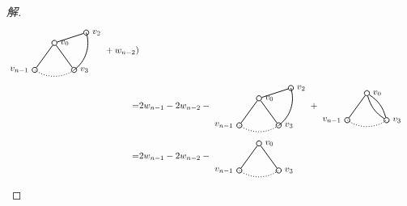 \documentclass{article}
\begin{document}
\begin{CJK}{UTF8}{gbsn}
\begin{proof}[解]
\begin{align*}
\begin{tikzpicture}[auto,baseline={(current bounding box.center)},
    specification/.style ={circle, draw, thick, inner sep = 0pt, minimum size=2mm}]
    \node[specification] (A)  [label=0:$v_2$] at (18:1.3cm)  {};
   \node[specification] (D) [label=180:$v_{n-1}$] at (234:1.3cm)  {};
   \node[specification] (E)  [label=0:$v_3$] at (306:1.3cm)  {};
   \node[specification] (o)  [label=0:$v_0$] at (0,0)  {};
   \draw[thick] (A) to   (o);
   \draw[thick] (D) to  (o);
   \draw[thick] (E) to  (o);
   \draw[thick,dotted] (234:1.3cm) arc (234:306:1.3cm);
   \draw[thick] (306:1.3cm) arc (-54:18:1.3cm);
 \end{tikzpicture}+w_{n-2}
  )\\
  =&2w_{n-1} - 2w_{n-2} -
  \begin{tikzpicture}[auto,baseline={(current bounding box.center)},
    specification/.style ={circle, draw, thick, inner sep = 0pt, minimum size=2mm}]
    \node[specification] (A)  [label=0:$v_2$] at (18:1.3cm)  {};
   \node[specification] (D) [label=180:$v_{n-1}$] at (234:1.3cm)  {};
   \node[specification] (E)  [label=0:$v_3$] at (306:1.3cm)  {};
   \node[specification] (o)  [label=0:$v_0$] at (0,0)  {};
   \draw[thick] (A) to   (o);
   \draw[thick] (D) to  (o);
   \draw[thick] (E) to  (o);
   \draw[thick,dotted] (234:1.3cm) arc (234:306:1.3cm);
   \draw[thick] (306:1.3cm) arc (-54:18:1.3cm);
 \end{tikzpicture}+
  \begin{tikzpicture}[auto,baseline={(current bounding box.center)},
    specification/.style ={circle, draw, thick, inner sep = 0pt, minimum size=2mm}]
   \node[specification] (D) [label=180:$v_{n-1}$] at (234:1.3cm)  {};
   \node[specification] (E)  [label=0:$v_3$] at (306:1.3cm)  {};
   \node[specification] (o)  [label=0:$v_0$] at (0,0)  {};
   \draw[thick] (E) to [bend left = 20]  (o);
   \draw[thick] (E) to [bend right = 20]  (o);
   \draw[thick] (D) to  (o);
   \draw[thick,dotted] (234:1.3cm) arc (234:306:1.3cm);
 \end{tikzpicture}\\
  =&2w_{n-1} - 2w_{n-2} -
  \begin{tikzpicture}[auto,baseline={(current bounding box.center)},
    specification/.style ={circle, draw, thick, inner sep = 0pt, minimum size=2mm}]
   \node[specification] (D) [label=180:$v_{n-1}$] at (234:1.3cm)  {};
   \node[specification] (E)  [label=0:$v_3$] at (306:1.3cm)  {};
   \node[specification] (o)  [label=0:$v_0$] at (0,0)  {};
   \draw[thick] (E) to  (o);
   \draw[thick] (D) to  (o);
   \draw[thick,dotted] (234:1.3cm) arc (234:306:1.3cm);
 \end{tikzpicture}\\
\end{align*}

\end{proof}
\end{CJK}
\end{document}

